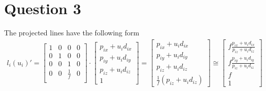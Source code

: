 \documentclass{article} %
\begin{document}
\section{Question 3}

The projected lines have the following form
\begin{align*}
l_i(u_i)' =
\begin{bmatrix}
1 & 0 & 0 & 0\\
0 & 1 & 0 & 0\\
0 & 0 & 1 & 0\\
0 & 0 & \frac{1}{f} & 0\\
\end{bmatrix}
\cdot
\begin{bmatrix}
p_{ix} + u_i d_{ix}\\
p_{iy} + u_i d_{iy}\\
p_{iz} + u_i d_{iz}\\
1
\end{bmatrix}
=
\begin{bmatrix}
p_{ix} + u_i d_{ix}\\
p_{iy} + u_i d_{iy}\\
p_{iz} + u_i d_{iz}\\
\frac{1}{f} \left(p_{iz} + u_i d_{iz}\right)
\end{bmatrix}
\cong
\begin{bmatrix}
f\frac{p_{ix} + u_i d_{ix}}{p_{iz} + u_i d_{iz}}\\
f\frac{p_{iy} + u_i d_{iy}}{p_{iz} + u_i d_{iz}}\\
f\\
1
\end{bmatrix}
\end{align*}
\end{document}
